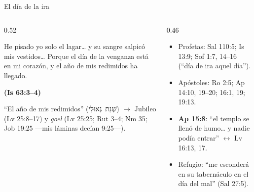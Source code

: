\documentclass[hyperref={bookmarks=false},aspectratio=169]{beamer}
\newcommand{\heb}[1]{\mbox{\foreignlanguage{hebrew}{#1}}}
\newcommand{\fuente}[1]{\par\hfill{\upshape\bfseries\footnotesize\textcolor{tierraroja}{#1}}}
\newcommand{\destacar}[1]{\textbf{\textcolor{tierraroja}{#1}}}
\begin{document}
\begin{frame}{El día de la ira}
\begin{columns}[t,onlytextwidth]
\begin{column}{0.52\textwidth}
\begin{cita}[fontupper=\scriptsize\itshape]He pisado yo solo el lagar\ldots{} y su sangre salpicó mis vestidos\ldots{} Porque el día de la venganza está en mi corazón, y el año de mis redimidos ha llegado.\fuente{(Is 63:3--4)}\end{cita}
\scriptsize ``El año de mis redimidos'' (\heb{שְׁנַת גְּאוּלַי}) $\rightarrow$ Jubileo (Lv 25:8--17) y \emph{goel} (Lv 25:25; Rut 3--4; Nm 35; Job 19:25 ---mis láminas decían 9:25---).
\end{column}
\begin{column}{0.46\textwidth}\scriptsize
\begin{itemize}
\item Profetas: Sal 110:5; Is 13:9; Sof 1:7, 14--16 (``día de ira aquel día'').
\item Apóstoles: Ro 2:5; Ap 14:10, 19--20; 16:1, 19; 19:13.
\item \destacar{Ap 15:8}: ``el templo se llenó de humo\ldots{} y nadie podía entrar'' $\leftrightarrow$ Lv 16:13, 17.
\item Refugio: ``me esconderá en su tabernáculo en el día del mal'' (Sal 27:5).
\end{itemize}
\end{column}
\end{columns}
\end{frame}
\end{document}
